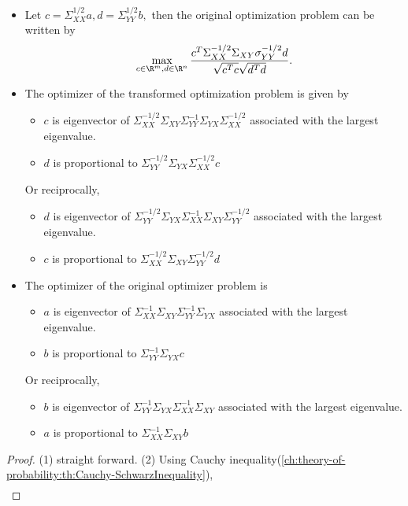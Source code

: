 \begin{refsection}
\begin{theorem}\hfill
\begin{itemize}
	\item Let $c = \Sigma_{XX}^{1/2}a, d = \Sigma_{YY}^{1/2}b,$ then the original optimization problem can be written by
	$$\max_{c\in \R^m, d\in \R^n}  \frac{c^T\Sigma_{XX}^{-1/2}\Sigma_{XY}\sigma_{YY}^{-1/2}d}{\sqrt{c^Tc}\sqrt{d^Td}}.$$
	\item The optimizer of the transformed optimization problem is given by
	\begin{itemize}
		\item $c$ is eigenvector of $\Sigma_{XX}^{-1/2}\Sigma_{XY}\Sigma_{YY}^{-1}\Sigma_{YX}\Sigma_{XX}^{-1/2}$ associated with the largest eigenvalue.
		\item $d$ is proportional to $\Sigma_{YY}^{-1/2}\Sigma_{YX}\Sigma_{XX}^{-1/2}c$
	\end{itemize}
	Or reciprocally, 
	\begin{itemize}
		\item $d$ is eigenvector of $\Sigma_{YY}^{-1/2}\Sigma_{YX}\Sigma_{XX}^{-1}\Sigma_{XY}\Sigma_{YY}^{-1/2}$ associated with the largest eigenvalue.
		\item $c$ is proportional to $\Sigma_{XX}^{-1/2}\Sigma_{XY}\Sigma_{YY}^{-1/2}d$
	\end{itemize}
	\item The optimizer of the original optimizer problem is
	\begin{itemize}
		\item $a$ is eigenvector of $\Sigma_{XX}^{-1}\Sigma_{XY}\Sigma_{YY}^{-1}\Sigma_{YX}$ associated with the largest eigenvalue.
		\item $b$ is proportional to $\Sigma_{YY}^{-1}\Sigma_{YX}c$
	\end{itemize}
	Or reciprocally, 
	\begin{itemize}
		\item $b$ is eigenvector of $\Sigma_{YY}^{-1}\Sigma_{YX}\Sigma_{XX}^{-1}\Sigma_{XY}$ associated with the largest eigenvalue.
		\item $a$ is proportional to $\Sigma_{XX}^{-1}\Sigma_{XY}b$
	\end{itemize}
\end{itemize}	
\end{theorem}
\begin{proof}
(1) straight forward. 
(2) Using Cauchy inequality(\autoref{ch:theory-of-probability:th:Cauchy-SchwarzInequality}), 
\begin{align*}

\end{align*}
\end{proof}
\end{refsection}
